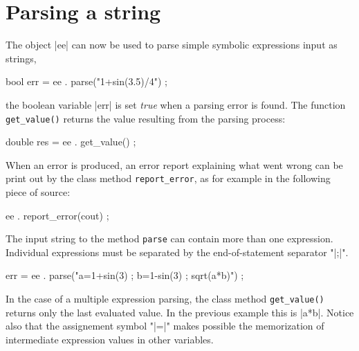 \documentclass[12pt]{article}
\newcommand{\METHOD}[1]{\texttt{\color{blue}#1}}
\renewcommand{\verb}{\SaveVerb[aftersave=\texttt{\color{red}\UseVerb{verb}}]{verb}}
\begin{document}
\section{Parsing a string}
The object \verb|ee| can now be used to parse simple symbolic expressions
input as strings,
\begin{code}
  bool err = ee . parse("1+sin(3.5)/4") ;
\end{code}
the boolean variable \verb|err| is set \textit{true} when a parsing 
error is found. The function \METHOD{get\_value()} returns the value 
resulting from the parsing process:
\begin{code}
  double res = ee . get_value() ;
\end{code}
When an error is produced, an error report explaining what went wrong
can be print out by the class method \METHOD{report\_error}, as
for example in the following piece of source:
\begin{code}
  ee . report_error(cout) ;
\end{code}
The input string to the method \METHOD{parse} can contain 
more than one expression. Individual expressions must be 
separated by the end-of-statement separator "\verb|;|".
\begin{code}
  err = ee . parse("a=1+sin(3) ; b=1-sin(3) ; sqrt(a*b)") ;
\end{code}
In the case of a multiple expression parsing, the class method 
\METHOD{get\_value()} returns only the last evaluated value.
In the previous example this is \verb|a*b|.
Notice also that the assignement symbol "\verb|=|" makes possible the 
memorization of intermediate expression values in other variables.
\end{document}
